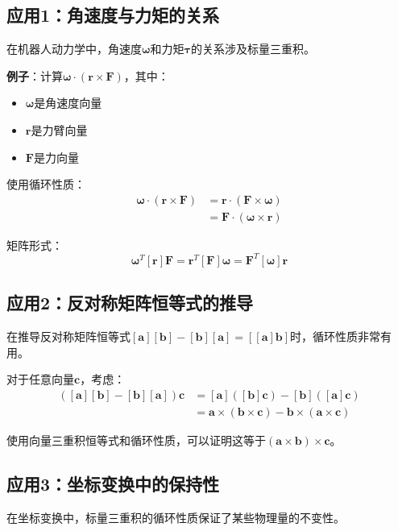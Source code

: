 \documentclass[12pt,a4paper]{article}
\begin{document}
\subsection{应用1：角速度与力矩的关系}

在机器人动力学中，角速度$\bm{\omega}$和力矩$\bm{\tau}$的关系涉及标量三重积。

\textbf{例子}：计算$\bm{\omega} \cdot (\bm{r} \times \bm{F})$，其中：
\begin{itemize}
\item $\bm{\omega}$是角速度向量
\item $\bm{r}$是力臂向量
\item $\bm{F}$是力向量
\end{itemize}

使用循环性质：
\begin{align}
\bm{\omega} \cdot (\bm{r} \times \bm{F}) &= \bm{r} \cdot (\bm{F} \times \bm{\omega}) \\
&= \bm{F} \cdot (\bm{\omega} \times \bm{r})
\end{align}

矩阵形式：
\begin{equation}
\bm{\omega}^T [\bm{r}] \bm{F} = \bm{r}^T [\bm{F}] \bm{\omega} = \bm{F}^T [\bm{\omega}] \bm{r}
\end{equation}

\subsection{应用2：反对称矩阵恒等式的推导}

在推导反对称矩阵恒等式$[\bm{a}][\bm{b}] - [\bm{b}][\bm{a}] = [[\bm{a}]\bm{b}]$时，循环性质非常有用。

对于任意向量$\bm{c}$，考虑：
\begin{align}
([\bm{a}][\bm{b}] - [\bm{b}][\bm{a}])\bm{c} &= [\bm{a}]([\bm{b}]\bm{c}) - [\bm{b}]([\bm{a}]\bm{c}) \\
&= \bm{a} \times (\bm{b} \times \bm{c}) - \bm{b} \times (\bm{a} \times \bm{c})
\end{align}

使用向量三重积恒等式和循环性质，可以证明这等于$(\bm{a} \times \bm{b}) \times \bm{c}$。

\subsection{应用3：坐标变换中的保持性}

在坐标变换中，标量三重积的循环性质保证了某些物理量的不变性。
\end{document}
